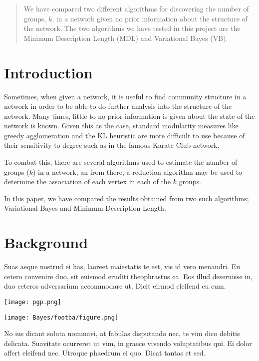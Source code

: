 \documentclass[twocolumn,twoside]{IEEEtran}
\author{Brett Israelsen & Joshua Rahm}
\begin{document}
\maketitle

\begin{abstract}
We have compared two different algorithms for discovering
the number of groups, $k$, in a network given no prior information about the
structure of the network. The two algorithms we have tested in this project are
the Minimum Description Length (MDL) and Variational Bayes (VB).
\end{abstract}

\section*{Introduction}

Sometimes, when given a network, it is useful to find community structure in a
network in order to be able to do further analysis into the structure of the
network. Many times, little to no prior information is given about the state of
the network is known. Given this as the case, standard modularity measures like
greedy agglomeration and the KL heuristic are more difficult to use because of their
sensitivity to degree such as in the famous Karate Club network.

To combat this, there are several algorithms used to estimate the number of groups ($k$)
in a network, an from there, a reduction algorithm may be used to determine the association
of each vertex in each of the $k$ groups.

In this paper, we have compared the results obtained from two such algorithms;
Variational Bayes and Minimum Description Length.

\section*{Background}

Suas aeque nostrud ei has, laoreet maiestatis te est, vis id vero menandri. Eu
cetero convenire duo, sit euismod eruditi theophrastus ea. Eos illud
deseruisse in, duo ceteros adversarium accommodare ut. Dicit eirmod eleifend
cu cum.

\texttt{[image: pgp.png]}

\texttt{[image: Bayes/footba/figure.png]}

 No ius dicant soluta nominavi, at fabulas disputando nec, te vim dico debitis
 delicata. Suavitate ocurreret ut vim, in graece vivendo voluptatibus qui. Ei
 dolor affert eleifend nec. Utroque phaedrum ei quo. Dicat tantas et sed.
\end{document}
